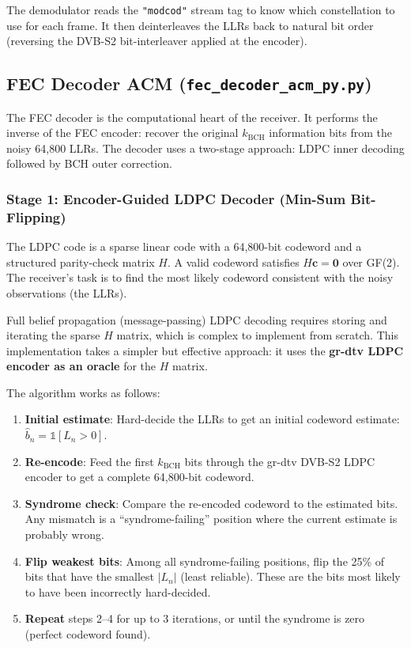 \documentclass[12pt,a4paper]{report}
\begin{document}
The demodulator reads the \texttt{"modcod"} stream tag to know which
constellation to use for each frame. It then deinterleaves the LLRs back to
natural bit order (reversing the DVB-S2 bit-interleaver applied at the encoder).

\subsection{FEC Decoder ACM (\texttt{fec\_decoder\_acm\_py.py})}
\label{sec:fec_decoder}

The FEC decoder is the computational heart of the receiver. It performs the
inverse of the FEC encoder: recover the original $k_\text{BCH}$ information
bits from the noisy 64,800 LLRs. The decoder uses a two-stage approach:
LDPC inner decoding followed by BCH outer correction.

\subsubsection{Stage 1: Encoder-Guided LDPC Decoder (Min-Sum Bit-Flipping)}

The LDPC code is a sparse linear code with a 64,800-bit codeword and a
structured parity-check matrix $H$. A valid codeword satisfies $H\mathbf{c} = \mathbf{0}$
over GF(2). The receiver's task is to find the most likely codeword consistent
with the noisy observations (the LLRs).

Full belief propagation (message-passing) LDPC decoding requires storing and
iterating the sparse $H$ matrix, which is complex to implement from scratch.
This implementation takes a simpler but effective approach: it uses the
\textbf{gr-dtv LDPC encoder as an oracle} for the $H$ matrix.

The algorithm works as follows:

\begin{enumerate}
    \item \textbf{Initial estimate}: Hard-decide the LLRs to get an initial
          codeword estimate: $\hat{b}_n = \mathbb{1}[L_n > 0]$.
    \item \textbf{Re-encode}: Feed the first $k_\text{BCH}$ bits through the
          gr-dtv DVB-S2 LDPC encoder to get a complete 64,800-bit codeword.
    \item \textbf{Syndrome check}: Compare the re-encoded codeword to the
          estimated bits. Any mismatch is a ``syndrome-failing'' position where
          the current estimate is probably wrong.
    \item \textbf{Flip weakest bits}: Among all syndrome-failing positions,
          flip the 25\% of bits that have the smallest $|L_n|$ (least
          reliable). These are the bits most likely to have been incorrectly
          hard-decided.
    \item \textbf{Repeat} steps 2--4 for up to 3 iterations, or until the
          syndrome is zero (perfect codeword found).
\end{enumerate}
\end{document}
